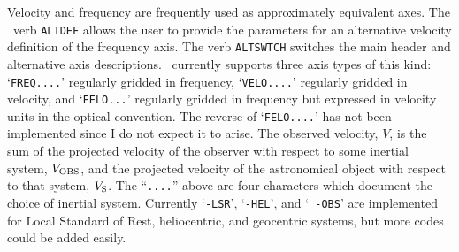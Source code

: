 Velocity and frequency are frequently used as approximately equivalent
axes. The \AIPS\ verb {\tt ALTDEF} allows the user to provide the
parameters for an alternative velocity definition of the frequency
axis.  The verb {\tt ALTSWTCH} switches the main header and
alternative axis descriptions.  \AIPS\ currently supports three axis
types of this kind: `{\tt FREQ....}' regularly gridded in frequency,
`{\tt VELO....}' regularly gridded in velocity, and `{\tt FELO...}'
regularly gridded in frequency but expressed in velocity units in the
optical convention.  The reverse of `{\tt FELO....}' has not been
implemented since I do not expect it to arise.  The observed velocity,
$V$, is the sum of the projected velocity of the observer with respect
to some inertial system, $V_{\hbox{\scriptsize OBS}}$, and the projected velocity of the
astronomical object with respect to that system, $V_{\hbox{\scriptsize S}}$. The
``{\tt....}'' above are four characters which document the choice of
inertial system.  Currently `{\tt -LSR}', `{\tt -HEL}', and `{\tt
-OBS}' are implemented for Local Standard of Rest, heliocentric, and
geocentric systems, but more codes could be added easily.

